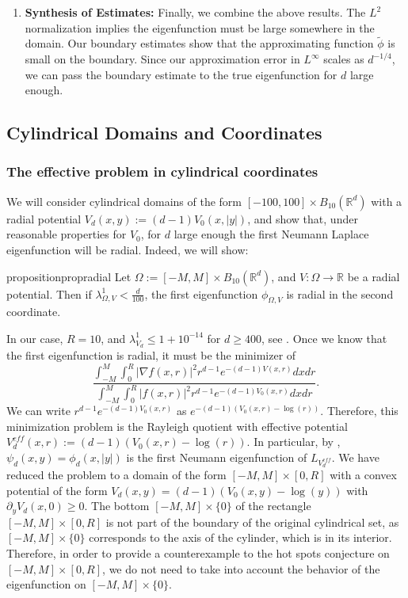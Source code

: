 \begin{enumerate}
    \item \textbf{Synthesis of Estimates:} Finally, we combine the above results. The $L^2$ normalization implies the eigenfunction must be large somewhere in the domain. Our boundary estimates show that the approximating function $\tilde \phi$ is small on the boundary. Since our approximation error in $L^\infty$ scales as $d^{-1/4}$, we can pass the boundary estimate to the true eigenfunction for $d$ large enough.
\end{enumerate}

\subsection{Cylindrical Domains and Coordinates}


\subsubsection*{The effective problem in cylindrical coordinates} 
We will consider cylindrical domains of the form $[-100,100]\times B_{10}(\mathbb R^d)$ with a radial potential $V_d(x,y):= (d-1)V_0(x,|y|)$, and show that, under reasonable properties for $V_0$, for $d$ large enough the first Neumann Laplace eigenfunction will be radial. Indeed, we will show:

\begin{restatable}{proposition}{propradial}
    Let $\Omega:=[-M,M]\times B_{10}(\mathbb R^d)$, and $V: \Omega \to \mathbb R$ be a radial potential. Then if $\lambda^{1}_{\Omega,V}<\frac{d}{100}$, the first eigenfunction $\phi_{\Omega,V}$ is radial in the second coordinate.
\end{restatable}
    


In our case, $R=10$, and $\lambda^{1}_{V_d} \le 1+10^{-14}$ for $d \ge 400$, see . Once we know that the first eigenfunction is radial, it must be the minimizer of 
$$
\frac{\int_{-M}^M \int_0^R |\nabla f(x, r)|^2 r^{d-1} e^{-(d-1) V(x,r)} dx dr}{\int_{-M}^M \int_0^R |f(x, r)|^2 r^{d-1} e^{-(d-1) V_0(x,r)} dx dr}.
$$
We can write $r^{d-1} e^{-(d-1) V_0(x,r)}$ as $e^{-(d-1)(V_0(x,r)-\log(r))}$. Therefore, this minimization problem is the Rayleigh quotient with effective potential $V^{eff}_d (x,r) := (d-1)(V_0(x,r)-\log(r))$. In particular, by , $\psi_d(x,y) = \phi_d(x,|y|)$ is the first Neumann eigenfunction of $L_{V^{eff}_d}$. We have reduced the problem to a domain of the form $[-M,M]\times [0,R]$ with a convex potential of the form $V_d(x,y) = (d-1)(V_0(x,y)-\log(y))$ with $\partial_y V_d (x,0) \ge 0$. The bottom $[-M,M]\times \{0\}$ of the rectangle $[-M,M]\times [0,R]$ is not part of the boundary of the original cylindrical set, as $[-M,M]\times \{0\}$ corresponds to the axis of the cylinder, which is in its interior. Therefore, in order to provide a counterexample to the hot spots conjecture on $[-M,M]\times [0,R]$, we do not need to take into account the behavior of the eigenfunction on $[-M,M]\times \{0\}$.



